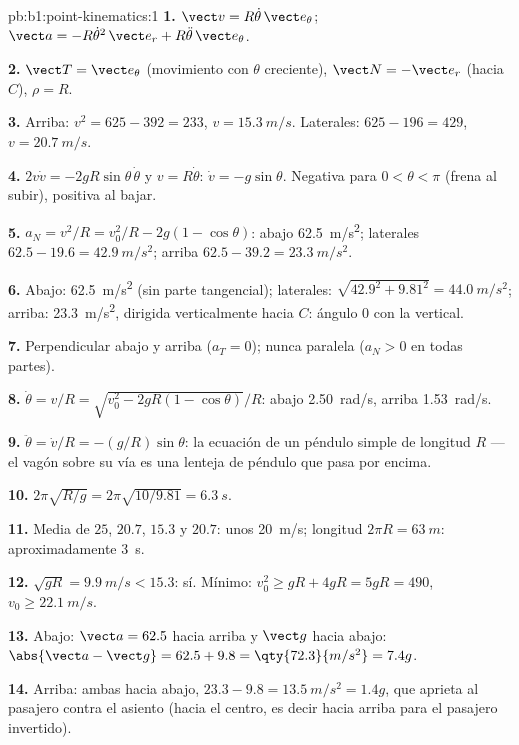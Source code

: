 \begin{solution}{pb:b1:point-kinematics:1}
\textbf{1.} $\vect v = R\dot\theta\,\vect e_\theta$; $\vect a = -R\dot\theta^2
\,\vect e_r + R\ddot\theta\,\vect e_\theta$.

\textbf{2.} $\vect T = \vect e_\theta$ (movimiento con $\theta$ creciente),
$\vect N = -\vect e_r$ (hacia $C$), $\rho = R$.

\textbf{3.} Arriba: $v^2 = 625 - 392 = 233$, $v = \qty{15.3}{m/s}$.
Laterales: $625 - 196 = 429$, $v = \qty{20.7}{m/s}$.

\textbf{4.} $2v\dot v = -2gR\sin\theta\,\dot\theta$ y $v = R\dot\theta$:
$\dot v = -g\sin\theta$. Negativa para $0 < \theta < \pi$ (frena al
subir), positiva al bajar.

\textbf{5.} $a_N = v^2/R = v_0^2/R - 2g(1 - \cos\theta)$: abajo
\qty{62.5}{m/s^2}; laterales $62.5 - 19.6 = \qty{42.9}{m/s^2}$; arriba $62.5 -
39.2 = \qty{23.3}{m/s^2}$.

\textbf{6.} Abajo: \qty{62.5}{m/s^2} (sin parte tangencial); laterales:
$\sqrt{42.9^2 + 9.81^2} = \qty{44.0}{m/s^2}$; arriba: \qty{23.3}{m/s^2},
dirigida verticalmente hacia $C$: ángulo $0$ con la vertical.

\textbf{7.} Perpendicular abajo y arriba ($a_T = 0$); nunca paralela
($a_N > 0$ en todas partes).

\textbf{8.} $\dot\theta = v/R = \sqrt{v_0^2 - 2gR(1 - \cos\theta)}/R$:
abajo \qty{2.50}{rad/s}, arriba \qty{1.53}{rad/s}.

\textbf{9.} $\ddot\theta = \dot v/R = -(g/R)\sin\theta$: la ecuación de un
péndulo simple de longitud $R$ --- el vagón sobre su vía es una lenteja de
péndulo que pasa por encima.

\textbf{10.} $2\pi\sqrt{R/g} = 2\pi\sqrt{10/9.81} = \qty{6.3}{s}$.

\textbf{11.} Media de $25$, $20.7$, $15.3$ y $20.7$: unos \qty{20}{m/s};
longitud $2\pi R = \qty{63}{m}$: aproximadamente \qty{3}{s}.

\textbf{12.} $\sqrt{gR} = \qty{9.9}{m/s} < 15.3$: sí. Mínimo: $v_0^2 \geq
gR + 4gR = 5gR = 490$, $v_0 \geq \qty{22.1}{m/s}$.

\textbf{13.} Abajo: $\vect a = 62.5$ hacia arriba y $\vect g$ hacia abajo:
$\abs{\vect a - \vect g} = 62.5 + 9.8 = \qty{72.3}{m/s^2} = 7.4g$.

\textbf{14.} Arriba: ambas hacia abajo, $23.3 - 9.8 = \qty{13.5}{m/s^2} = 1.4g$,
que aprieta al pasajero contra el asiento (hacia el centro, es decir hacia
arriba para el pasajero invertido).


\end{solution}
